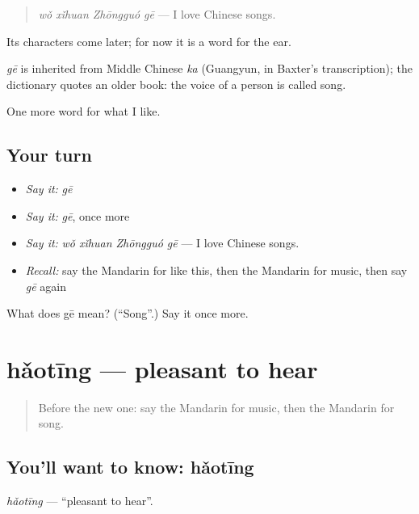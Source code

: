 \begin{quote}
\emph{wǒ xǐhuan Zhōngguó gē} — I love Chinese songs.
\end{quote}

Its characters come later; for now it is a word for the ear.

\begin{cousinweb}
\emph{gē} is inherited from Middle Chinese \emph{ka} (Guangyun, in Baxter's transcription); the dictionary quotes an older book: the voice of a person is called song.
\end{cousinweb}

\begin{grammarlens}[title={What you've built}]
One more word for what I like.
\end{grammarlens}

\subsection*{Your turn}
\begin{itemize}
\raggedright
  \item \emph{Say it:} \emph{gē}
  \item \emph{Say it:} \emph{gē}, once more
  \item \emph{Say it:} \emph{wǒ xǐhuan Zhōngguó gē} — I love Chinese songs.
  \item \emph{Recall:} say the Mandarin for like this, then the Mandarin for music, then say \emph{gē} again
\end{itemize}

\begin{tcolorbox}[breakable,colback=teal!4,colframe=teal!35!black,title={Before you move on}]
What does gē mean? (\textquotedblleft{}Song\textquotedblright{}.) Say it once more.
\end{tcolorbox}
\section[hǎotīng]{hǎotīng — pleasant to hear}

\label{lesson:ZH-C128-haoting}



\begin{quote}
Before the new one: say the Mandarin for music, then the Mandarin for song.
\end{quote}

\subsection*{You'll want to know: hǎotīng}
\emph{hǎotīng} — \textquotedblleft{}pleasant to hear\textquotedblright{}.

